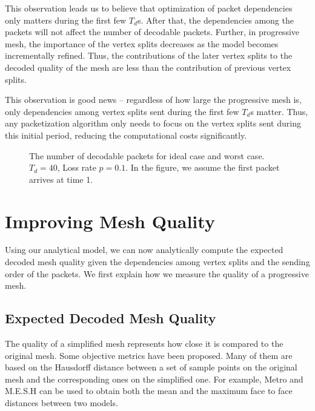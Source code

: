     This observation leads us to believe that optimization of
    packet dependencies only matters during the first few $T_d$s. 
    After that, the dependencies among the packets will not affect
    the number of decodable packets.  Further, in progressive mesh,
    the importance of the vertex splits decreases as the model becomes
    incrementally refined.  Thus, the contributions of the later vertex
    splits to the decoded quality of the mesh are less than the contribution
    of previous vertex splits.

    This observation is good news -- regardless of how large the
    progressive mesh is, only dependencies among vertex splits sent during the
    first few $T_d$s matter.  Thus, any packetization
    algorithm only needs to focus on the vertex splits sent during
    this initial period, reducing the computational costs significantly.

\begin{figure}[htbp]
\centering
{}
\caption[The number of decodable packets for ideal case and worst case.]
        {The number of decodable packets for ideal case and worst case. $T_d= 40$, Loss rate $p =0.1$. In the figure, we assume the first packet arrives at time 1.}\label{model:extreme}
\end{figure}


\section{Improving Mesh Quality}
\label{s:model:quality}
    Using our analytical model, we can now analytically compute the
    expected decoded mesh quality given the dependencies among %
    vertex splits and %
    the sending order of the packets.
    We first explain how we measure the
    quality of a progressive mesh.
\subsection{Expected Decoded Mesh Quality}
\label{s:model:analytical_quality}
    The quality of a simplified mesh represents how close it
    is compared to the original mesh. Some objective
    metrics have been proposed. Many of them are based on the
    Hausdorff distance between a set of sample points on the original
    mesh and the corresponding ones on the simplified one.
    For example, Metro \cite{cignoni98metro} and M.E.S.H \cite{mesh:aspert}
    can be used to obtain both the mean and the maximum face to face distances
    between two models.

